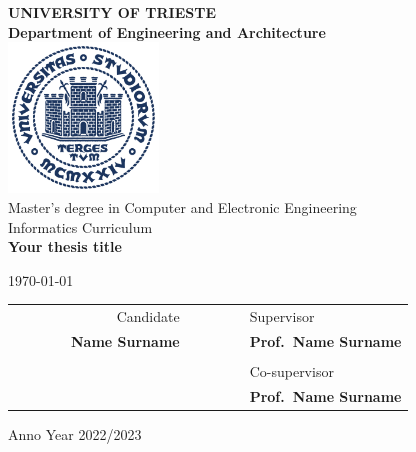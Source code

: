 \begin{titlepage}
    \begin{center}
        {\LARGE {\bfseries UNIVERSITY OF TRIESTE \\}}
        \vspace{.5cm}
        {\Large {\bfseries Department of Engineering and Architecture \\}}
        \vspace{1cm}
        \includegraphics[width=4cm,height=4cm]{img/units_sigillo_pantone-534}\\[1.5cm]

        {\LARGE
            Master's degree in Computer and Electronic Engineering \\
        }
        {\LARGE
                Informatics Curriculum \\
        }
        \vspace{1cm}
        {\LARGE
            {\bfseries Your thesis title}
        }
        \vspace{1cm}

        {\large \today \\
        }

        \vfill
        \begin{table}[h]\label{tab:table}
            {\large
                    \begin{tabular}{c c c c r c c | c c l}
                        & & & & Candidate & & & & & Supervisor \\
                        & & & & \bfseries Name Surname & & & & & \bfseries Prof.\ Name Surname \\
                        & & & & & & & & & \\
                        & & & & & & & & & Co-supervisor \\
                        & & & & & & & & & \bfseries Prof.\ Name Surname \\
                    \end{tabular}
                }
        \end{table}
        Anno Year 2022/2023
    \end{center}
\end{titlepage}
